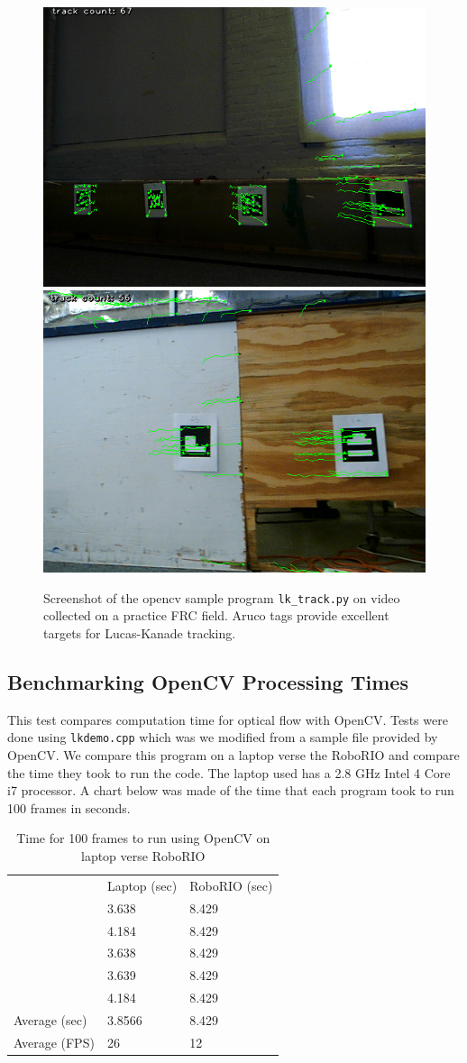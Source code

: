 \documentclass{article}
\begin{document}
    \begin{figure}[H]
      \centering
      \includegraphics[width=0.49\linewidth]{./images/optflow.png}
      \includegraphics[width=0.49\linewidth]{./images/optflow_2.png}
      \caption{Screenshot of the opencv sample program \texttt{lk\_track.py} on video collected on a practice FRC field. Aruco tags provide excellent targets for Lucas-Kanade tracking.}
      \label{fig:opt_flow}
    \end{figure}

  \subsection{Benchmarking OpenCV Processing Times} \label{section:profiling_opencv}

    This test compares computation time for optical flow with OpenCV. Tests were done using \texttt{lkdemo.cpp} which was we modified from a sample file provided by OpenCV. We compare this program on a laptop verse the RoboRIO and compare the time they took to run the code. The laptop used has a 2.8 GHz Intel 4 Core i7 processor. A chart below was made of the time that each program took to run 100 frames in seconds.

    \begin{table}[H]
      \centering
      \begin{tabular}{l|l|l|}
        \cline{2-3}
        & Laptop (sec) & RoboRIO (sec) \\
        \cline{2-3}
        & 3.638 & 8.429 \\
        & 4.184 & 8.429\\
        & 3.638 & 8.429 \\
        & 3.639 & 8.429 \\
        & 4.184 & 8.429 \\
        \hline
        \multicolumn{1}{|l|}{Average (sec)} & 3.8566 & 8.429 \\
        \multicolumn{1}{|l|}{Average (FPS)} & 26 & 12 \\
        \hline
      \end{tabular}
      \caption{Time for 100 frames to run using OpenCV on laptop verse RoboRIO}
      \label{table:optical_flow_benchmark}
    \end{table}
\end{document}
